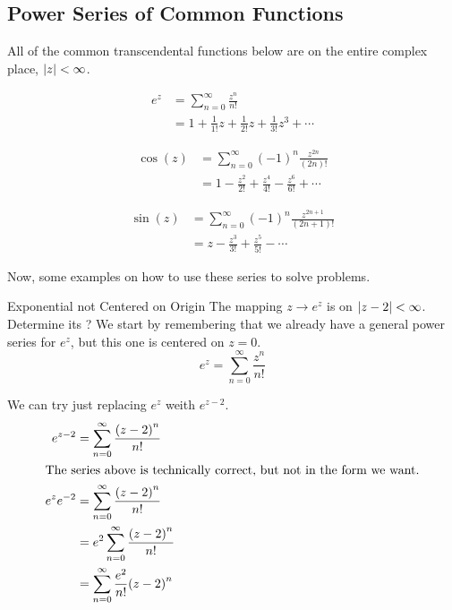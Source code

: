 \subsection{Power Series of Common Functions}\label{subsec:Common_Function_Power_Series}
All of the common transcendental functions below are  on the entire complex place, $\left\lvert z \right\rvert < \infty$.

\begin{equation}\label{eq:Complex_Power_Series-e}
  \begin{aligned}
    e^{z} &= \sum_{n=0}^{\infty} \frac{z^{n}}{n!} \\
    & = 1 + \frac{1}{1!} z + \frac{1}{2!} z + \frac{1}{3!} z^{3} + \cdots
  \end{aligned}
\end{equation}

\begin{equation}\label{eq:Complex_Power_Series-cos}
  \begin{aligned}
    \cos(z) &= \sum_{n=0}^{\infty} {(-1)}^{n} \frac{z^{2n}}{(2n)!} \\
    &= 1 - \frac{z^{2}}{2!} + \frac{z^{4}}{4!} - \frac{z^{6}}{6!} + \cdots
  \end{aligned}
\end{equation}

\begin{equation}\label{eq:Complex_Power_Series-sin}
  \begin{aligned}
    \sin(z) &= \sum_{n=0}^{\infty} {(-1)}^{n} \frac{z^{2n+1}}{(2n+1)!} \\
    &= z - \frac{z^{3}}{3!} + \frac{z^{5}}{5!} - \cdots
  \end{aligned}
\end{equation}

Now, some examples on how to use these series to solve problems.
\begin{example}{Exponential not Centered on Origin}
  The mapping $z \to e^{z}$ is  on $\left\lvert z-2 \right\rvert < \infty$.
  Determine its ?
  \tcblower{}
  We start by remembering that we already have a general power series for $e^{z}$, but this one is centered on $z = 0$.
  \begin{equation*}
    e^{z} = \sum_{n=0}^{\infty} \frac{z^{n}}{n!}
  \end{equation*}

  We can try just replacing $e^{z}$ weith $e^{z-2}$.
  \begin{align*}
    e^{z-2} &= \sum_{n=0}^{\infty} \frac{{(z-2)}^{n}}{n!} \\
    \intertext{The series above is technically correct, but not in the form we want.}
    e^{z} e^{-2} &= \sum_{n=0}^{\infty} \frac{{(z-2)}^{n}}{n!} \\
            &= e^{2} \sum_{n=0}^{\infty} \frac{{(z-2)}^{n}}{n!} \\
            &= \sum_{n=0}^{\infty} \frac{e^{2}}{n!} {(z-2)}^{n} \\
  \end{align*}
\end{example}

